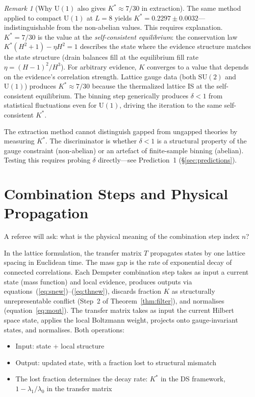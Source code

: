 \documentclass[11pt,a4paper]{article}
\theoremstyle{definition}
\theoremstyle{remark}
\newtheorem{remark}[theorem]{Remark}
\newcommand{\SU}{\mathrm{SU}}
\begin{document}
\begin{remark}[Why $\mathrm{U}(1)$ also gives $K^*\approx 7/30$ in extraction]\label{rem:U1}
The same method applied to compact $\mathrm{U}(1)$ at $L=8$ yields $K^*=0.2297\pm 0.0032$---indistinguishable from the non-abelian values. This requires explanation. $K^*=7/30$ is the value at the \emph{self-consistent equilibrium}: the conservation law $K^*(H^2+1)-\eta H^2=1$ describes the state where the evidence structure matches the state structure (drain balances fill at the equilibrium fill rate $\eta=(H-1)^2/H^3$). For arbitrary evidence, $K$ converges to a value that depends on the evidence's correlation strength. Lattice gauge data (both $\SU(2)$ and $\mathrm{U}(1)$) produces $K^*\approx 7/30$ because the thermalized lattice IS at the self-consistent equilibrium. The binning step generically produces $\delta<1$ from statistical fluctuations even for $\mathrm{U}(1)$, driving the iteration to the same self-consistent $K^*$.

The extraction method cannot distinguish gapped from ungapped theories by measuring $K^*$. The discriminator is whether $\delta<1$ is a structural property of the gauge constraint (non-abelian) or an artefact of finite-sample binning (abelian). Testing this requires probing $\delta$ directly---see Prediction~1 (\S\ref{sec:predictions}).
\end{remark}


\section{Combination Steps and Physical Propagation}\label{sec:steps}

A referee will ask: what is the physical meaning of the combination step index $n$?

In the lattice formulation, the transfer matrix $T$ propagates states by one lattice spacing in Euclidean time. The mass gap is the rate of exponential decay of connected correlations. Each Dempster combination step takes as input a current state (mass function) and local evidence, produces outputs via equations~(\ref{eq:snew})--(\ref{eq:thnew}), discards fraction $K$ as structurally unrepresentable conflict (Step~2 of Theorem~\ref{thm:filter}), and normalises (equation~\ref{eq:mout}). The transfer matrix takes as input the current Hilbert space state, applies the local Boltzmann weight, projects onto gauge-invariant states, and normalises. Both operations:
\begin{itemize}[nosep]
\item Input: state + local structure
\item Output: updated state, with a fraction lost to structural mismatch
\item The lost fraction determines the decay rate: $K^*$ in the DS framework, $1-\lambda_1/\lambda_0$ in the transfer matrix
\end{itemize}
\end{document}
